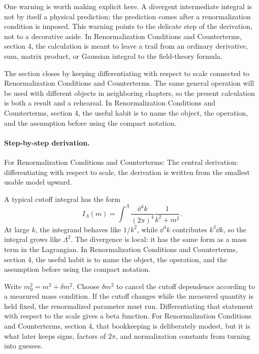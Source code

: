 One warning is worth making explicit here.  A divergent intermediate integral is not by itself a physical prediction; the prediction comes after a renormalization condition is imposed.  This warning points to the delicate step of the derivation, not to a decorative aside.  In Renormalization Conditions and Counterterms, section 4, the calculation is meant to leave a trail from an ordinary derivative, sum, matrix product, or Gaussian integral to the field-theory formula.

The section closes by keeping differentiating with respect to scale connected to Renormalization Conditions and Counterterms.  The same general operation will be used with different objects in neighboring chapters, so the present calculation is both a result and a rehearsal.  In Renormalization Conditions and Counterterms, section 4, the useful habit is to name the object, the operation, and the assumption before using the compact notation.



\paragraph{Step-by-step derivation.}

For Renormalization Conditions and Counterterms: The central derivation: differentiating with respect to scale, the derivation is written from the smallest usable model upward.

A typical cutoff integral has the form
\[
  I_\Lambda(m)=\int^{\Lambda}\frac{\dd^4k}{(2\pi)^4}\frac{1}{k^2+m^2}.
\]
At large \(k\), the integrand behaves like \(1/k^2\), while \(\dd^4k\) contributes \(k^3\dd k\), so the integral grows like \(\Lambda^2\).  The divergence is local: it has the same form as a mass term in the Lagrangian.  In Renormalization Conditions and Counterterms, section 4, the useful habit is to name the object, the operation, and the assumption before using the compact notation.

Write \(m_0^2=m^2+\delta m^2\).  Choose \(\delta m^2\) to cancel the cutoff dependence according to a measured mass condition.  If the cutoff changes while the measured quantity is held fixed, the renormalized parameter must run.  Differentiating that statement with respect to the scale gives a beta function.  For Renormalization Conditions and Counterterms, section 4, that bookkeeping is deliberately modest, but it is what later keeps signs, factors of \(2\pi\), and normalization constants from turning into guesses.

